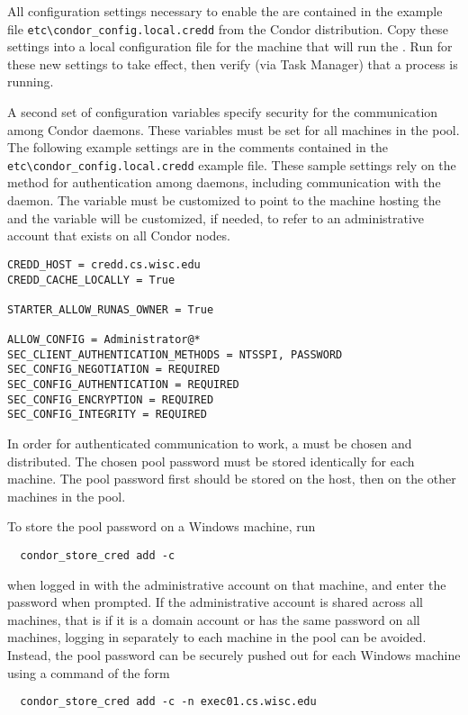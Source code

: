 All configuration settings necessary to enable the  are
contained in the example file \verb|etc\condor_config.local.credd|
from the Condor distribution. Copy these settings into a local
configuration file for the machine that will run the .
Run  for these new settings to take effect, then
verify (via Task Manager) that a  process is running.

A second set of configuration variables specify security for the
communication among Condor daemons.
These variables must be set for all machines in the pool.
The following example settings are in the comments contained in the
\verb|etc\condor_config.local.credd| example file.
These sample settings rely on the  method for
authentication among daemons, 
including communication with the  daemon.
The  variable must be customized to point to the machine
hosting the  and the  variable
will be customized, if needed, to refer to an administrative account 
that exists on all Condor nodes. 
\begin{verbatim}
CREDD_HOST = credd.cs.wisc.edu
CREDD_CACHE_LOCALLY = True

STARTER_ALLOW_RUNAS_OWNER = True

ALLOW_CONFIG = Administrator@*
SEC_CLIENT_AUTHENTICATION_METHODS = NTSSPI, PASSWORD
SEC_CONFIG_NEGOTIATION = REQUIRED
SEC_CONFIG_AUTHENTICATION = REQUIRED
SEC_CONFIG_ENCRYPTION = REQUIRED
SEC_CONFIG_INTEGRITY = REQUIRED
\end{verbatim}

In order for  authenticated communication to work,
a  must be chosen and distributed.
The chosen pool password must be stored identically for each machine.
The pool password first should be
stored on the  host, then on the other machines in the pool.

To store the pool password on a Windows machine, run
\begin{verbatim}
  condor_store_cred add -c
\end{verbatim}
when logged in with the administrative account on that machine,
and enter the password when prompted. 
If the administrative account is shared across all machines,
that is if it is a domain account or has the same password on all machines,
logging in separately to each machine in the pool can be avoided.
Instead, the pool password can be securely pushed out for each Windows machine
using a command of the form
\begin{verbatim}
  condor_store_cred add -c -n exec01.cs.wisc.edu
\end{verbatim}

